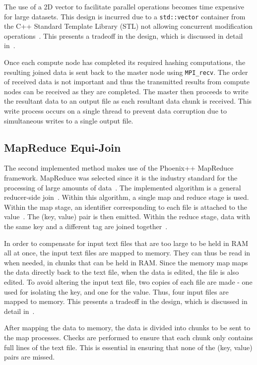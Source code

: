 \documentclass[12pt,twocolumn]{witseiepaper}
\begin{document}
The use of a 2D vector to facilitate parallel operations becomes time expensive for large datasets. This design is incurred due to a \texttt{std::vector} container from the C++ Standard Template Library (STL) not allowing concurrent modification operations~\cite{stl-vector}. This presents a tradeoff in the design, which is discussed in detail in~.

Once each compute node has completed its required hashing computations, the resulting joined data is sent back to the master node using \texttt{MPI\_recv}. The order of received data is not important and thus the transmitted results from compute nodes can be received as they are completed. The master then proceeds to write the resultant data to an output file as each resultant data chunk is received. This write process occurs on a single thread to prevent data corruption due to simultaneous writes to a single output file.

\subsection{MapReduce Equi-Join}
The second implemented method makes use of the Phoenix++ MapReduce framework. MapReduce was selected since it is the industry standard for the processing of large amounts of data~\cite{comparingMPIMapReduce}. The implemented algorithm is a general reducer-side join~\cite{mapReduceJoin}. Within this algorithm, a single map and reduce stage is used. Within the map stage, an identifier corresponding to each file is attached to the value~\cite{mapReduceJoin}. The (key, value) pair is then emitted. Within the reduce stage, data with the same key and a different tag are joined together~\cite{mapReduceJoin}.

In order to compensate for input text files that are too large to be held in RAM all at once, the input text files are mapped to memory. They can thus be read in when needed, in chunks that can be held in RAM. Since the memory map maps the data directly back to the text file, when the data is edited, the file is also edited. To avoid altering the input text file, two copies of each file are made - one used for isolating the key, and one for the value. Thus, four input files are mapped to memory. This presents a tradeoff in the design, which is discussed in detail in~.

After mapping the data to memory, the data is divided into chunks to be sent to the map processes. Checks are performed to ensure that each chunk only contains full lines of the text file. This is essential in ensuring that none of the (key, value) pairs are missed.
\end{document}
